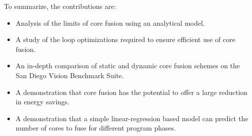 To summarize, the contributions are:

\begin{itemize}
\item Analysis of the limits of core fusion using an analytical model.
\item A study of the loop optimizations required to ensure efficient use of core fusion.
\item An in-depth comparison of static and dynamic core fusion schemes on the San Diego Vision Benchmark Suite.
\item A demonstration that core fusion has the potential to offer a large reduction in energy savings.
\item A demonstration that a simple linear-regression based model can predict the number of cores to fuse for different program phases.
\end{itemize}




